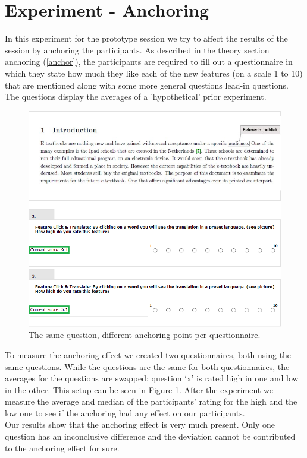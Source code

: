 \documentclass[Main.tex]{subfiles}
\begin{document}
\section{Experiment - Anchoring}

In this experiment for the prototype session we try to affect the results of the session by anchoring the participants. As described in the theory section anchoring (\ref{anchor}), the participants are required to fill out a questionnaire in which they state how much they like each of the new features (on a scale 1 to 10) that are mentioned along with some more general questions lead-in questions. The questions display the averages of a 'hypothetical' prior experiment.  \\

\begin{figure}
\includegraphics[width=1\textwidth]{QuestionComparison.png}
\caption{The same question, different anchoring point per questionnaire.}
\label{fig:qComp}
\end{figure}

To measure the anchoring effect we created two questionnaires, both using the same questions. While the questions are the same for both questionnaires, the averages for the questions are swapped; question `x' is rated high in one and low in the other. This setup can be seen in Figure \ref{fig:qComp}. After the experiment we measure the average and median of the participants' rating for the high and the low one to see if the anchoring had any effect on our participants.\\

Our results show that the anchoring effect is very much present. Only one question has an inconclusive difference and the deviation cannot be contributed to the anchoring effect for sure.
\end{document}

